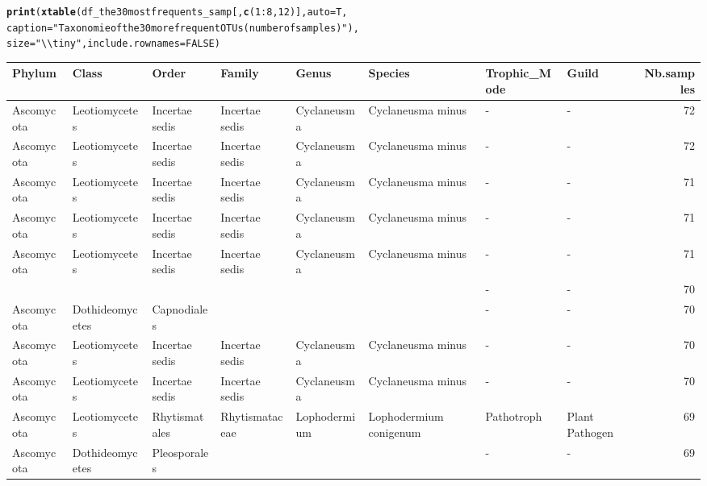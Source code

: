 \documentclass[12pt]{article}\usepackage[]{graphicx}\usepackage[]{color}
\makeatletter
\newcommand{\hlnum}[1]{\textcolor[rgb]{0.686,0.059,0.569}{#1}}%
\newcommand{\hlstr}[1]{\textcolor[rgb]{0.192,0.494,0.8}{#1}}%
\newcommand{\hlopt}[1]{\textcolor[rgb]{0,0,0}{#1}}%
\newcommand{\hlstd}[1]{\textcolor[rgb]{0.345,0.345,0.345}{#1}}%
\newcommand{\hlkwc}[1]{\textcolor[rgb]{0.333,0.667,0.333}{#1}}%
\newcommand{\hlkwd}[1]{\textcolor[rgb]{0.737,0.353,0.396}{\textbf{#1}}}%
\newenvironment{kframe}{%
 \def\at@end@of@kframe{}%
 \ifinner\ifhmode%
  \def\at@end@of@kframe{\end{minipage}}%
  \begin{minipage}{\columnwidth}%
 \fi\fi%
 \def\FrameCommand##1{\hskip\@totalleftmargin \hskip-\fboxsep
 \colorbox{shadecolor}{##1}\hskip-\fboxsep
     \hskip-\linewidth \hskip-\@totalleftmargin \hskip\columnwidth}%
 \MakeFramed {\advance\hsize-\width
   \@totalleftmargin\z@ \linewidth\hsize
   \@setminipage}}%
 {\par\unskip\endMakeFramed%
 \at@end@of@kframe}
\numberwithin{figure}{section}
\makeatother
\begin{document}
\begin{landscape}
\begin{kframe}
\begin{alltt}
\hlkwd{print}\hlstd{(}\hlkwd{xtable}\hlstd{(df_the30mostfrequents_samp[,} \hlkwd{c}\hlstd{(}\hlnum{1}\hlopt{:}\hlnum{8}\hlstd{,} \hlnum{12}\hlstd{)],} \hlkwc{auto} \hlstd{= T,}
      \hlkwc{caption} \hlstd{=} \hlstr{"Taxonomie of the 30 more frequent OTUs (number of samples)"}\hlstd{),}
      \hlkwc{size} \hlstd{=} \hlstr{"\textbackslash{}\textbackslash{}tiny"}\hlstd{,} \hlkwc{include.rownames} \hlstd{=} \hlnum{FALSE}\hlstd{)}
\end{alltt}
\end{kframe}%
\begin{table}[ht]
\centering
\begingroup\tiny
\begin{tabular}{llllllllr}
  \hline
Phylum & Class & Order & Family & Genus & Species & Trophic\_Mode & Guild & Nb.samples \\ 
  \hline
Ascomycota & Leotiomycetes & Incertae sedis & Incertae sedis & Cyclaneusma & Cyclaneusma minus & - & - & 72 \\ 
  Ascomycota & Leotiomycetes & Incertae sedis & Incertae sedis & Cyclaneusma & Cyclaneusma minus & - & - & 72 \\ 
  Ascomycota & Leotiomycetes & Incertae sedis & Incertae sedis & Cyclaneusma & Cyclaneusma minus & - & - & 71 \\ 
  Ascomycota & Leotiomycetes & Incertae sedis & Incertae sedis & Cyclaneusma & Cyclaneusma minus & - & - & 71 \\ 
  Ascomycota & Leotiomycetes & Incertae sedis & Incertae sedis & Cyclaneusma & Cyclaneusma minus & - & - & 71 \\ 
   &  &  &  &  &  & - & - & 70 \\ 
  Ascomycota & Dothideomycetes & Capnodiales &  &  &  & - & - & 70 \\ 
  Ascomycota & Leotiomycetes & Incertae sedis & Incertae sedis & Cyclaneusma & Cyclaneusma minus & - & - & 70 \\ 
  Ascomycota & Leotiomycetes & Incertae sedis & Incertae sedis & Cyclaneusma & Cyclaneusma minus & - & - & 70 \\ 
  Ascomycota & Leotiomycetes & Rhytismatales & Rhytismataceae & Lophodermium & Lophodermium conigenum & Pathotroph & Plant Pathogen & 69 \\ 
  Ascomycota & Dothideomycetes & Pleosporales &  &  &  & - & - & 69 \\ 

\end{tabular}
\end{table}
\end{landscape}
\end{document}
